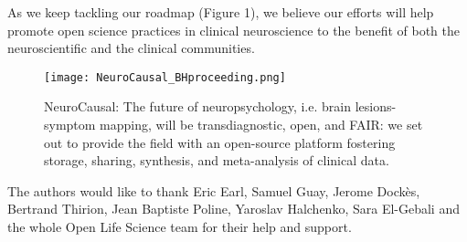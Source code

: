 \documentclass[../main.tex]{subfiles}
\begin{document}
As we keep tackling our roadmap (Figure 1), we believe our efforts will help promote open science practices in clinical neuroscience to the benefit of both the neuroscientific and the clinical communities.


\begin{figure}
	\centering
	\texttt{[image: NeuroCausal\_BHproceeding.png]}
	\caption{NeuroCausal: The future of neuropsychology, i.e. brain lesions-symptom mapping, will be transdiagnostic, open, and FAIR: we set out to provide the field with an open-source platform fostering storage, sharing, synthesis, and meta-analysis of clinical data.
}
	\label{fig:NeuroCausal}
\end{figure}

 The authors would like to thank Eric Earl, Samuel Guay, Jerome Dockès, Bertrand Thirion, Jean Baptiste Poline, Yaroslav Halchenko, Sara El-Gebali and the whole Open Life Science team for their help and support.
\end{document}
